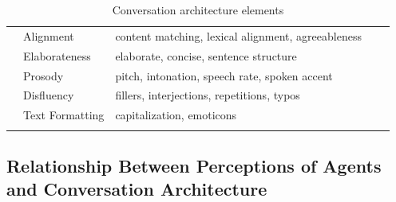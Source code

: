 \documentclass[sigconf,screen,review, anonymous]{acmart}
\newcommand{\cmt}[1]{}%
\begin{document}
\begin{table}[h]
{\begin{tabular}{@{}p{} | p{} | p{} | >{\centering}p{} | p{} @{}}
& Alignment & content matching, lexical \newline alignment, agreeableness & 7
& \cite{healey2013relating}\cmt{[39]}\cite{hoegen2019end}\cmt{[31]}\cite{huiyang2022improving}\cmt{[17]}\cite{linnemann2018can}\cmt{[15]}\cite{spillner2021talk}\cmt{[18]}\cite{volkel2021examining}\cmt{[69]}\cite{volkel2021manipulating}\cmt{[68]}
\\ \cline{2-5}

& Elaborateness & elaborate, concise, sentence \newline structure & 6
& \cite{haas2022keep}\cmt{[78]}\cite{miehle2018exploring}\cmt{[51]}\cite{moilanen2022measuring}\cmt{[82]}\cite{roy2021users}\cmt{[71]}\cite{volkel2021manipulating}\cmt{[68]}\cite{volkel2022user}\cmt{[75]}
\\ \Xhline{1.2pt}

\multirow{3}{*}{Speech Format} & Prosody & pitch, intonation, speech rate, \newline spoken accent & 12
& \cite{chan2021kinvoices}\cmt{[74]}\cite{choi2020nobody}\cmt{[54]}\cite{dubiel2020persuasive}\cmt{[60]}\cite{feijoo2021effects}\cmt{[70]}\cite{habler2019effects}\cmt{[63]}\cite{hu2021enhancing}\cmt{[56]}\cite{jestin2022effects}\cmt{[81]}\cite{kim2020can}\cmt{[24]}\cite{lubold2016effects}\cmt{[86]}\cite{misu2011toward}\cmt{[83]}\cite{tolmeijer2021female}\cmt{[62]}\cite{zhu2022effects}\cmt{[26]}
\\ \cline{2-5}

& Disfluency & fillers, interjections, repetitions, \newline typos & 7
& \cite{ceha2022expressive}\cmt{[77]}\cite{hu2021enhancing}\cmt{[56]}\cite{jeong2019exploring}\cmt{[10]}\cite{niewiadomski2013laugh}\cmt{[85]}\cite{wester2015artificial}\cmt{[14]}\cite{westerman2019believe}\cmt{[9]}\cite{yang2021effect}\cmt{[72]}
\\ \cline{2-5}

& Text Formatting & capitalization, emoticons & 6
& \cite{fadhil2018effect}\cmt{[52]}\cite{kim2019comparing}\cmt{[89]}\cite{seeger2021chatbots}\cmt{[35]}\cite{volkel2022user}\cmt{[75]}\cite{westerman2019believe}\cmt{[9]}\cite{wilhelm2022keep}\cmt{[28]}
\\ \Xhline{1.2pt}
\end{tabular}%
}
\caption{Conversation architecture elements}
\label{tab:cues}
\end{table}

\subsection{Relationship Between Perceptions of Agents and Conversation Architecture}
\end{document}
